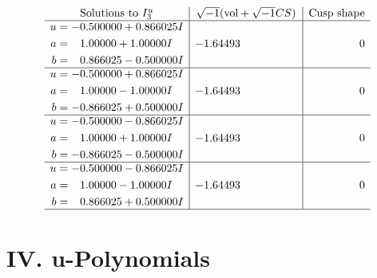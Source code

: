 \documentclass[1p]{elsarticle_modified}
\theoremstyle{definition}
\newcommand{\I}{\sqrt{-1}}
\begin{document}
$$\begin{array}{c|c|c}  
\text{Solutions to }I^u_{3}& \I (\text{vol} + \sqrt{-1}CS) & \text{Cusp shape}\\
 \hline 
\begin{aligned}
u &= -0.500000 + 0.866025 I \\
a &= \phantom{-}1.00000 + 1.00000 I \\
b &= \phantom{-}0.866025 - 0.500000 I\end{aligned}
 & -1.64493\phantom{ +0.000000I} & \phantom{-0.000000 } 0 \\ \hline\begin{aligned}
u &= -0.500000 + 0.866025 I \\
a &= \phantom{-}1.00000 - 1.00000 I \\
b &= -0.866025 + 0.500000 I\end{aligned}
 & -1.64493\phantom{ +0.000000I} & \phantom{-0.000000 } 0 \\ \hline\begin{aligned}
u &= -0.500000 - 0.866025 I \\
a &= \phantom{-}1.00000 + 1.00000 I \\
b &= -0.866025 - 0.500000 I\end{aligned}
 & -1.64493\phantom{ +0.000000I} & \phantom{-0.000000 } 0 \\ \hline\begin{aligned}
u &= -0.500000 - 0.866025 I \\
a &= \phantom{-}1.00000 - 1.00000 I \\
b &= \phantom{-}0.866025 + 0.500000 I\end{aligned}
 & -1.64493\phantom{ +0.000000I} & \phantom{-0.000000 } 0\\
 \hline 
 \end{array}$$\newpage
\newpage\renewcommand{\arraystretch}{1}
\centering \section*{ IV. u-Polynomials}
\end{document}
